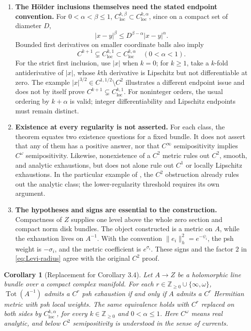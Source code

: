 \documentclass[11pt]{amsart}
\newtheorem{corollary}[theorem]{Corollary}
\theoremstyle{definition}
\theoremstyle{remark}
\numberwithin{equation}{section}
\newcommand{\Tot}{\operatorname{Tot}}
\newcommand{\loc}{\mathrm{loc}}
\begin{document}
\begin{enumerate}[label=\textup{\arabic*.},leftmargin=*]
\item \textbf{The H\"older inclusions themselves need the stated endpoint convention.}
For $0<\alpha<\beta\le1$,
$C^{k,\beta}_{\loc}\subset C^{k,\alpha}_{\loc}$, since on a compact
set of diameter $D$,
\[
|x-y|^\beta\le D^{\beta-\alpha}|x-y|^\alpha.
\]
Bounded first derivatives on smaller coordinate balls also imply
\[
C^{k+1}\subsetneq C^{k,1}_{\loc}\subset C^{k,\alpha}_{\loc}
\quad(0<\alpha<1).
\]
For the strict first inclusion, use $|x|$ when $k=0$; for $k\ge1$,
take a $k$-fold antiderivative of $|x|$, whose $k$th derivative is
Lipschitz but not differentiable at zero. The example
$|x|^{3/2}\in C^{1,1/2}\setminus C^2$ illustrates a different
endpoint issue and does not by itself prove
$C^{k+1}\subsetneq C^{k,1}_{\loc}$. For noninteger orders, the usual
ordering by $k+\alpha$ is valid; integer differentiability and
Lipschitz endpoints must remain distinct.

\item \textbf{Existence at every regularity is not asserted.}
For each class, the theorem equates two existence questions for a
fixed bundle. It does not assert that any of them has a positive
answer, nor that $C^\infty$ semipositivity implies $C^\omega$
semipositivity. Likewise, nonexistence of a $C^2$ metric rules out
$C^2$, smooth, and analytic exhaustions, but does not alone rule out
$C^1$ or locally Lipschitz exhaustions. In the particular example of
\cite[Theorem~1.1]{CX}, the $C^2$ obstruction already rules out the
analytic class; the lower-regularity threshold requires its own argument.

\item \textbf{The hypotheses and signs are essential to the construction.}
Compactness of $Z$ supplies one level above the whole zero section
and compact norm disk bundles. The object constructed is a metric
on $A$, while the exhaustion lives on $A^{-1}$. With the convention
$\|e_i\|_h^2=e^{-\psi_i}$, the psh weight is $-\sigma_i$, and the
metric coefficient is $e^{\sigma_i}$. These signs and the factor $2$
in \eqref{eq:Levi-radius} agree with the original $C^2$ proof.
\end{enumerate}

\begin{corollary}[Replacement for Corollary 3.4]\label{cor:replacement}
Let $A\to Z$ be a holomorphic line bundle over a compact complex
manifold. For each $r\in\mathbb Z_{\ge0}\cup\{\infty,\omega\}$,
$\Tot(A^{-1})$ admits a $C^r$ psh exhaustion if and only if $A$
admits a $C^r$ Hermitian metric with psh local weights. The same
equivalence holds with $C^r$ replaced on both sides by
$C^{k,\alpha}_{\loc}$, for every $k\in\mathbb Z_{\ge0}$ and $0<\alpha\le1$.
Here $C^\omega$ means real analytic, and below $C^2$ semipositivity
is understood in the sense of currents.
\end{corollary}
\end{document}
